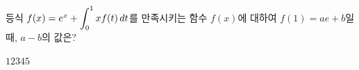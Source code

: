 \hspace*{2mm}\begin{minipage}[t]{\dimexpr\linewidth-2mm\relax}\vspace{0pt}
등식 $f(x)=e^x+\displaystyle\int_{0}^{1}xf(t)\mkern3mu dt$를 만족시키는 함수 $f(x)$에 대하여 $f(1)=ae+b$일 때, $a-b$의 값은? 
\begin{choices32}{$1$}{$2$}{$3$}{$4$}{$5$}\end{choices32}\end{minipage}
